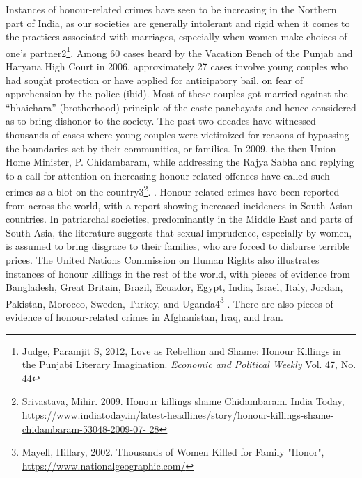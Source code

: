 \setcounter{figure}{0}
\setcounter{table}{0}
\setcounter{footnote}{0}

\label{2016-art3}



\begin{multicols}{2}


\noi
Instances of honour-related crimes have seen to be increasing in the Northern part of
India, as our societies are generally intolerant and rigid when it comes to the practices
associated with marriages, especially when women make choices of one’s partner2\footnote{Judge, Paramjit S, 2012, Love as Rebellion and Shame: Honour Killings in the Punjabi Literary
Imagination. \textit{Economic and Political Weekly} Vol. 47, No. 44}. Among 60 cases heard by the Vacation Bench of the Punjab and Haryana High Court
in 2006, approximately 27 cases involve young couples who had sought protection or
have applied for anticipatory bail, on fear of apprehension by the police (ibid). Most of
these couples got married against the “bhaichara” (brotherhood) principle of the caste
panchayats and hence considered as to bring dishonor to the society. The past two
decades have witnessed thousands of cases where young couples were victimized for
reasons of bypassing the boundaries set by their communities, or families. In 2009, the
then Union Home Minister, P. Chidambaram, while addressing the Rajya Sabha and
replying to a call for attention on increasing honour-related offences have called such
crimes as a blot on the country3\footnote{Srivastava, Mihir. 2009. Honour killings shame Chidambaram. India Today,
\url{https://www.indiatoday.in/latest-headlines/story/honour-killings-shame-chidambaram-53048-2009-07-
28}}.
.
\noi
Honour related crimes have been reported from across the world, with a report showing
increased incidences in South Asian countries. In patriarchal societies, predominantly
in the Middle East and parts of South Asia, the literature suggests that sexual
imprudence, especially by women, is assumed to bring disgrace to their families, who
are forced to disburse terrible prices. The United Nations Commission on Human
Rights also illustrates instances of honour killings in the rest of the world, with pieces
of evidence from Bangladesh, Great Britain, Brazil, Ecuador, Egypt, India, Israel, Italy,
Jordan, Pakistan, Morocco, Sweden, Turkey, and Uganda4\footnote{Mayell, Hillary, 2002. Thousands of Women Killed for Family "Honor",
\url{https://www.nationalgeographic.com/}}
. There are also pieces of
evidence of honour-related crimes in Afghanistan, Iraq, and Iran.


\end{multicols}
